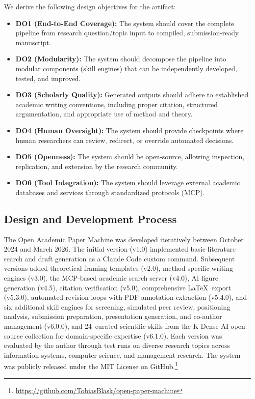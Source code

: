 \documentclass{article}
\begin{document}
We derive the following design objectives for the artifact:

\begin{itemize}
    \item \textbf{DO1 (End-to-End Coverage):} The system should cover the complete pipeline from research question/topic input to compiled, submission-ready manuscript.
    \item \textbf{DO2 (Modularity):} The system should decompose the pipeline into modular components (skill engines) that can be independently developed, tested, and improved.
    \item \textbf{DO3 (Scholarly Quality):} Generated outputs should adhere to established academic writing conventions, including proper citation, structured argumentation, and appropriate use of method and theory.
    \item \textbf{DO4 (Human Oversight):} The system should provide checkpoints where human researchers can review, redirect, or override automated decisions.
    \item \textbf{DO5 (Openness):} The system should be open-source, allowing inspection, replication, and extension by the research community.
    \item \textbf{DO6 (Tool Integration):} The system should leverage external academic databases and services through standardized protocols (MCP).
\end{itemize}

\subsection{Design and Development Process}

The Open Academic Paper Machine was developed iteratively between October 2024 and March 2026. The initial version (v1.0) implemented basic literature search and draft generation as a Claude Code custom command. Subsequent versions added theoretical framing templates (v2.0), method-specific writing engines (v3.0), the MCP-based academic search server (v4.0), AI figure generation (v4.5), citation verification (v5.0), comprehensive \LaTeX\ export (v5.3.0), automated revision loops with PDF annotation extraction (v5.4.0), and six additional skill engines for screening, simulated peer review, positioning analysis, submission preparation, presentation generation, and co-author management (v6.0.0), and 24~curated scientific skills from the K-Dense AI open-source collection for domain-specific expertise (v6.1.0). Each version was evaluated by the author through test runs on diverse research topics across information systems, computer science, and management research. The system was publicly released under the MIT License on GitHub.\footnote{\url{https://github.com/TobiasBlask/open-paper-machine}}
\end{document}
